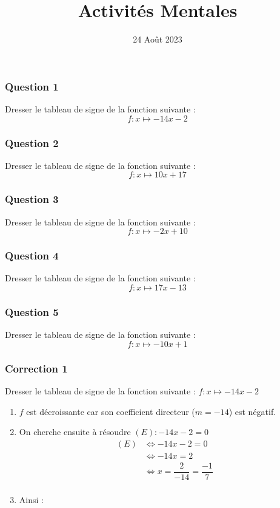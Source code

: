 \documentclass[15pt, mathserif]{beamer}
\title{Activités Mentales}
\date{24 Août 2023}
\begin{document}
\begin{frame}
    \titlepage
\end{frame}

\begin{frame} 
	\frametitle{Question 1}
Dresser le tableau de signe de la fonction suivante : $$ f:x\mapsto-14x-2$$\end{frame}


\begin{frame} 
	\frametitle{Question 2}
Dresser le tableau de signe de la fonction suivante : $$ f:x\mapsto10x+17$$\end{frame}


\begin{frame} 
	\frametitle{Question 3}
Dresser le tableau de signe de la fonction suivante : $$ f:x\mapsto-2x+10$$\end{frame}


\begin{frame} 
	\frametitle{Question 4}
Dresser le tableau de signe de la fonction suivante : $$ f:x\mapsto17x-13$$\end{frame}


\begin{frame} 
	\frametitle{Question 5}
Dresser le tableau de signe de la fonction suivante : $$ f:x\mapsto-10x+1$$\end{frame}


\begin{frame}
\vspace{-10mm}
	\frametitle{Correction 1}
\vspace*{1cm} 
 \footnotesize{Dresser le tableau de signe de la fonction suivante : $ f:x\mapsto-14x-2$} 
 \begin{enumerate} 
 \item $f$ est décroissante car son coefficient directeur ($m=-14$) est négatif.
 \item On cherche ensuite à résoudre  $(E) : -14x-2=0 $	 
 \begin{align*} (E)& \Leftrightarrow -14x-2=0\\
		 	 & \Leftrightarrow -14x=2\\
			 & \Leftrightarrow x= \dfrac{2}{-14}=\dfrac{-1}{7}\\
	 \end{align*} 
 \item Ainsi : \\ 
 \end{enumerate} 
 \end{frame}
\end{document}
